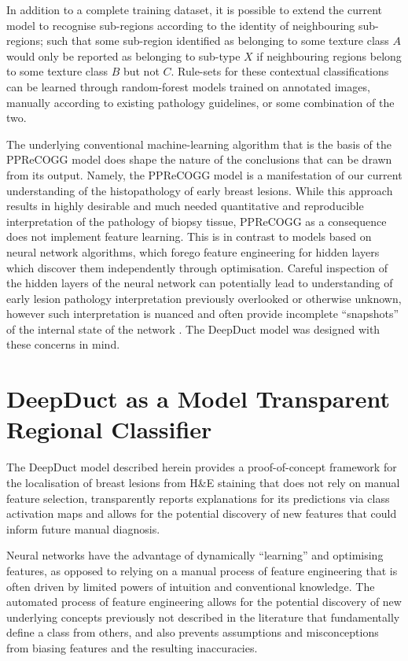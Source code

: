 In addition to a complete training dataset, it is possible to extend the current model to recognise sub-regions according to the identity of neighbouring sub-regions; such that some sub-region identified as belonging to some texture class $A$ would only be reported as belonging to sub-type $X$ if neighbouring regions belong to some texture class $B$ but not $C$. Rule-sets for these contextual classifications can be learned through random-forest models trained on annotated images, manually according to existing pathology guidelines, or some combination of the two. \par

The underlying conventional machine-learning algorithm that is the basis of the \mbox{PPReCOGG} model does shape the nature of the conclusions that can be drawn from its output. Namely, the PPReCOGG model is a manifestation of our current understanding of the histopathology of early breast lesions. While this approach results in highly desirable and much needed quantitative and reproducible interpretation of the pathology of biopsy tissue, PPReCOGG as a consequence does not implement feature learning. This is in contrast to models based on neural network algorithms, which forego feature engineering for hidden layers which discover them independently through optimisation. Careful inspection of the hidden layers of the neural network can potentially lead to understanding of early lesion pathology interpretation previously overlooked or otherwise unknown, however such interpretation is nuanced and often provide incomplete ``snapshots'' of the internal state of the network \citep{erhan2010, zeiler2013}. The DeepDuct model was designed with these concerns in mind.\par

\section{DeepDuct as a Model Transparent Regional Classifier}

The DeepDuct model described herein provides a proof-of-concept framework for the localisation of breast lesions from H\&E staining that does not rely on manual feature selection, transparently reports explanations for its predictions via class activation maps and allows for the potential discovery of new features that could inform future manual diagnosis.\par

Neural networks have the advantage of dynamically ``learning'' and optimising features, as opposed to relying on a manual process of feature engineering that is often driven by limited powers of intuition and conventional knowledge. The automated process of feature engineering allows for the potential discovery of new underlying concepts previously not described in the literature that fundamentally define a class from others, and also prevents assumptions and misconceptions from biasing features and the resulting inaccuracies.\par

